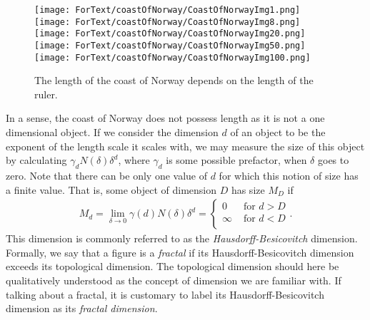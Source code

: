 \documentclass[twoside,utf8]{article}
\newcommand{\EQU}[1] { \begin{equation*} \begin{split} #1 \end{split} \end{equation*} }
\newcommand{\EQUn}[1] { \begin{equation} \begin{split} #1 \end{split} \end{equation} }
\begin{document}
\begin{figure}[H]
	\begin{center}
	\texttt{[image: ForText/coastOfNorway/CoastOfNorwayImg1.png]}
	\texttt{[image: ForText/coastOfNorway/CoastOfNorwayImg8.png]}
	\texttt{[image: ForText/coastOfNorway/CoastOfNorwayImg20.png]}
	\texttt{[image: ForText/coastOfNorway/CoastOfNorwayImg50.png]}
	\texttt{[image: ForText/coastOfNorway/CoastOfNorwayImg100.png]}
	\end{center}
	\caption{The length of the coast of Norway depends on the length of the ruler. }
	\label{fig:coastOfNorway}
\end{figure}

\noindent
In a sense, the coast of Norway does not possess length as it is not a one dimensional object. If we consider the dimension $d$ of an object to be the exponent of the length scale it scales with, we may measure the size of this object by calculating $\gamma_d N(\delta) \delta^d$, where $\gamma_d$ is some possible prefactor, when $\delta$ goes to zero. Note that there can be only one value of $d$ for which this notion of size has a finite value. That is, some object of dimension $D$ has size $M_D$ if
\EQUn{
M_d = \lim_{\delta \rightarrow 0} \gamma(d) N(\delta) \delta^d
=
\begin{cases}
0 & \text{ for } d>D \\
\infty & \text{ for } d<D \\
\end{cases}. \label{eq:fractalDimension}
}
This dimension is commonly referred to as the {\it Hausdorff-Besicovitch} dimension. Formally, we say that a figure is a {\it fractal} if its Hausdorff-Besicovitch dimension exceeds its topological dimension. The topological dimension should here be qualitatively understood as the concept of dimension we are familiar with. If talking about a fractal, it is customary to label its Hausdorff-Besicovitch dimension as its {\it fractal dimension}.




\begin{comment}
\EQU{
\gamma = \frac{\rho g h R}{2 \cos \theta}
}

\subsection{Gravity effects}

\end{comment}
\end{document}

